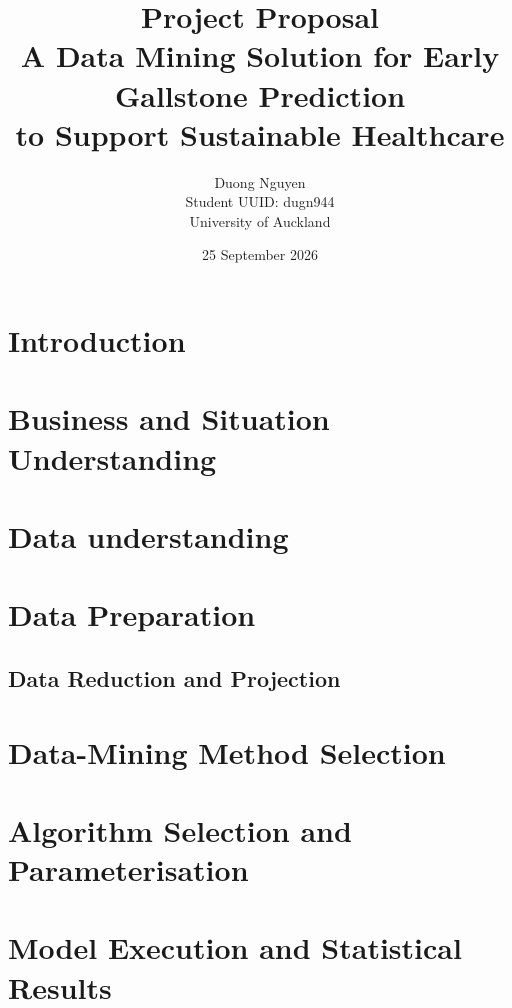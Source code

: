 \documentclass[a4paper]{article}
\title{
    \textbf{Project Proposal}\\[0.4cm]
    \large A Data Mining Solution for Early Gallstone Prediction\\
    to Support Sustainable Healthcare
}
\author{
    Duong Nguyen\\
    Student UUID: dugn944\\
    University of Auckland
}
\date{25 September 2026}
\begin{document}
\maketitle
\tableofcontents
\newpage

\section{Introduction}


\section{Business and Situation Understanding}
\label{sec:business-understanding}


\section{Data understanding}
\label{sec:data-understanding}


\section{Data Preparation}
\label{sec:data-preparation}


\subsection{Data Reduction and Projection}
\label{sec:data-reduction}


\section{Data-Mining Method Selection}
\label{sec:dm-method-selection}


\section{Algorithm Selection and Parameterisation}
\label{sec:algorithm-selection}


\section{Model Execution and Statistical Results}
\label{sec:model-building}

\end{document}
